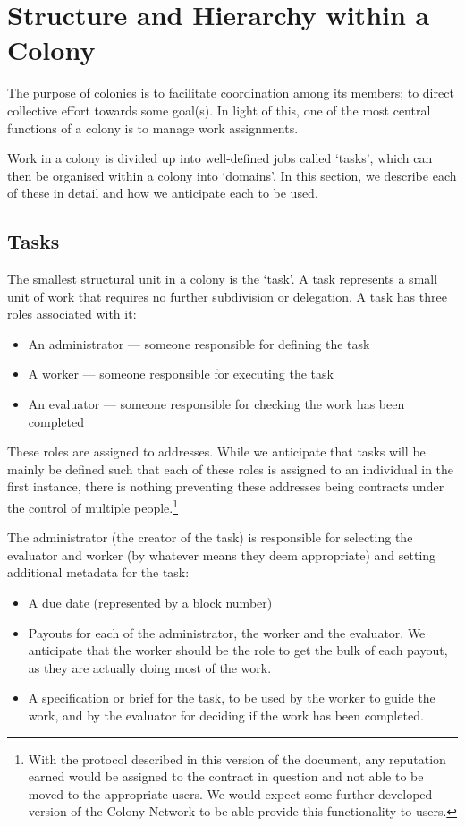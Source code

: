 \section{Structure and Hierarchy within a Colony}
The purpose of colonies is to facilitate coordination among its members; to direct collective effort towards some goal(s). In light of this, one of the most central functions of a colony is to manage work assignments.

Work in a colony is divided up into well-defined jobs called `tasks', which can then be organised within a colony into `domains'. In this section, we describe each of these in detail and how we anticipate each to be used.

\subsection{Tasks}\label{sec:tasks}

The smallest structural unit in a colony is the `task'. A task represents a small unit of work that requires no further subdivision or delegation. A task has three roles associated with it:
\begin{itemize}
\item An administrator --- someone responsible for defining the task
\item A worker --- someone responsible for executing the task
\item An evaluator --- someone responsible for checking the work has been completed
\end{itemize}

These roles are assigned to addresses. While we anticipate that tasks will be mainly be defined such that each of these roles is assigned to an individual in the first instance, there is nothing preventing these addresses being contracts under the control of multiple people.\footnote{With the protocol described in this version of the document, any reputation earned would be assigned to the contract in question and not able to be moved to the appropriate users. We would expect some further developed version of the Colony Network to be able provide this functionality to users.}

The administrator (the creator of the task) is responsible for selecting the evaluator and worker (by whatever means they deem appropriate) and setting additional metadata for the task:

\begin{itemize}
\item A due date (represented by a block number)
\item Payouts for each of the administrator, the worker and the evaluator. We anticipate that the worker should be the role to get the bulk of each payout, as they are actually doing most of the work. 
\item A specification or brief for the task, to be used by the worker to guide the work, and by the evaluator for deciding if the work has been completed.
\end{itemize}

